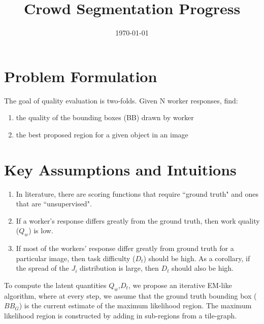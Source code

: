 \documentclass[12pt]{article}
\begin{document}
\title{Crowd Segmentation Progress}
\author{\today}
\date{}
\vspace{-50pt}
\maketitle
\vspace{-70pt}
\section{Problem Formulation}
 The goal of quality evaluation is two-folds. Given N worker responses, find: 
 \begin{enumerate}
\item the quality of the bounding boxes (BB) drawn by worker 
\item the best proposed region for a given object in an image
 \end{enumerate}
\section{Key Assumptions and Intuitions}
\begin{enumerate}
\item In literature, there are scoring functions that require ``ground truth" and ones that are ``unsupervised". 
\item If a worker's response differs greatly from the ground truth, then work quality ($Q_w$) is low. 
\item If most of the workers' response differ greatly from ground truth for a particular image, then task difficulty ($D_t$) should be high. As a corollary, if the spread of the $J_i$ distribution is large, then $D_t$ should also be high.
\end{enumerate}
To compute the latent quantities $Q_w$,$D_t$, we propose an iterative EM-like algorithm, where at every step, we assume that the ground truth bounding box ($BB_G$) is the current estimate of the maximum likelihood region. The maximum likelihood region is constructed by adding in sub-regions from a tile-graph. 
\end{document}
